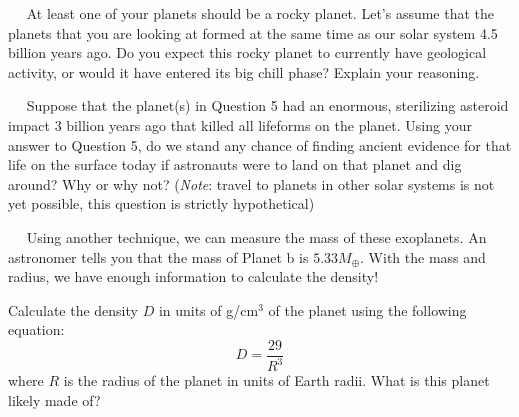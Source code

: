 \documentclass[12pt]{article}
\newcommand{\question}[1]{\vspace{10mm} \noindent {\bf #1)}~~}
\begin{document}
\question{5} At least one of your planets should be a rocky planet. Let's assume that the planets that you are looking at formed at the same time as our solar system 4.5 billion years ago. Do you expect this rocky planet to currently have geological activity, or would it have entered its big chill phase? Explain your reasoning.
\vspace{6 cm}


\question{6} Suppose that the planet(s) in Question 5 had an enormous, sterilizing asteroid impact 3 billion years ago that killed all lifeforms on the planet. Using your answer to Question 5, do we stand any chance of finding ancient evidence for that life on the surface today if astronauts were to land on that planet and dig around? Why or why not? ({\it Note}: travel to planets in other solar systems is not yet possible, this question is strictly hypothetical)
\vspace{6 cm}

\question{7} Using another technique, we can measure the mass of these exoplanets. An astronomer tells you that the mass of Planet b is $5.33 M_\oplus$. With the mass and radius, we have enough information to calculate the density! 

Calculate the density $D$ in units of g/cm$^3$ of the planet using the following equation: 
\begin{equation}
D = \frac{29}{R^3}
\end{equation}
where $R$ is the radius of the planet in units of Earth radii. What is this planet likely made of?
\end{document}
